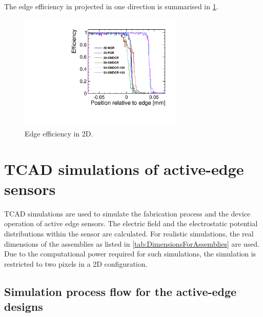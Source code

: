 The edge efficiency in projected in one direction is summarised in \cref{fig:EdgeEff_2D}.
\begin{figure}[htbp]
  \centering
  \includegraphics[width=0.7\textwidth]{figures/ActiveEdge/edgeEff_2D.pdf}
  \caption{Edge efficiency in 2D.}
  \label{fig:EdgeEff_2D}
\end{figure}

\newpage
\section{TCAD simulations of active-edge sensors}

TCAD simulations are used to simulate the fabrication process and the
device operation of active edge sensors. The electric field and the
electrostatic potential distributions within the sensor are
calculated. For realistic simulations, the real dimensions of the
assemblies as listed in \cref{tab:DimensionsForAssemblies} are
used. Due to the computational power required for such simulations,
the simulation is restricted to two pixels in a 2D configuration.


\subsection{Simulation process flow for the active-edge designs}\label{sec:processFlow}


